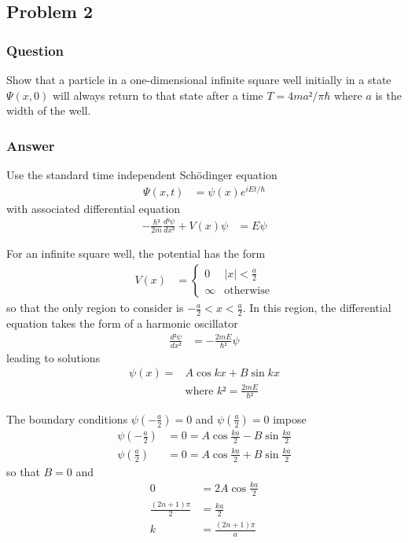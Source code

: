 \clearpage
\subsection{Problem 2}
\subsubsection{Question}

Show that a particle in a one-dimensional infinite square well initially in a
state $Ψ(x,0)$ will always return to that state after a time $T = 4ma²/π\hbar$
where $a$ is the width of the well.

\subsubsection{Answer}
Use the standard time independent Schödinger equation
\begin{align*}
	Ψ(x,t) &= ψ(x) e^{iEt/\hbar}
\end{align*}
with associated differential equation
\begin{align*}
	-\frac{\hbar²}{2m} \frac{d²ψ}{dx²} + V(x)ψ &= Eψ
\end{align*}

For an infinite square well, the potential has the form
\begin{align*}
	V(x) &=
		\begin{cases}
			0	&	|x| < \frac{a}{2} \\
			∞	&	\text{otherwise}
		\end{cases}
\end{align*}
so that the only region to consider is $-\frac{a}{2} < x < \frac{a}{2}$. In this
region, the differential equation takes the form of a harmonic oscillator
\begin{align*}
	\frac{d²ψ}{dx²} &= -\frac{2mE}{\hbar²}ψ
\end{align*}
leading to solutions
\begin{align*}
	ψ(x) ={}& A\cos kx + B\sin kx \\
	{}& \text{where } k² = \frac{2mE}{\hbar²}
\end{align*}

The boundary conditions $ψ(-\frac{a}{2}) = 0$ and $ψ(\frac{a}{2}) = 0$ impose
\begin{align*}
	ψ\left(-\frac{a}{2}\right) &= 0 = A\cos \frac{ka}{2} - B\sin \frac{ka}{2} \\
	ψ\left(\frac{a}{2}\right)  &= 0 = A\cos \frac{ka}{2} + B\sin \frac{ka}{2}
\end{align*}
so that $B = 0$ and
\begin{align*}
	0 &= 2A \cos \frac{ka}{2} \\
	\frac{(2n+1)π}{2} &= \frac{ka}{2} \\
	k &= \frac{(2n+1)π}{a}
\end{align*}

